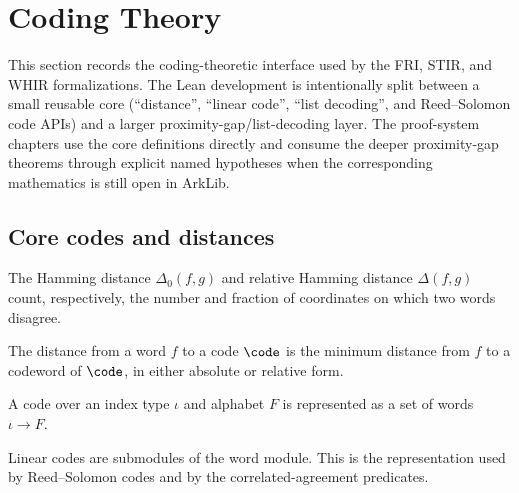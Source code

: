 \section{Coding Theory}\label{sec:coding_theory}

This section records the coding-theoretic interface used by the FRI, STIR, and WHIR
formalizations. The Lean development is intentionally split between a small reusable core
(``distance'', ``linear code'', ``list decoding'', and Reed--Solomon code APIs) and a larger
proximity-gap/list-decoding layer. The proof-system chapters use the core definitions directly
and consume the deeper proximity-gap theorems through explicit named hypotheses when the
corresponding mathematics is still open in ArkLib.

\subsection{Core codes and distances}\label{sec:coding_core}

\begin{definition}\label{def:code_distance}
    The Hamming distance $\Delta_0(f,g)$ and relative Hamming distance $\Delta(f,g)$ count,
    respectively, the number and fraction of coordinates on which two words disagree.
\end{definition}

\begin{definition}\label{def:distance_from_code}
    The distance from a word $f$ to a code $\code$ is the minimum distance from $f$ to a
    codeword of $\code$, in either absolute or relative form.
\end{definition}

\begin{definition}\label{def:code}
    A code over an index type $\iota$ and alphabet $F$ is represented as a set of words
    $\iota \to F$.
\end{definition}

\begin{definition}\label{def:linear_code}
    Linear codes are submodules of the word module. This is the representation used by
    Reed--Solomon codes and by the correlated-agreement predicates.
\end{definition}

